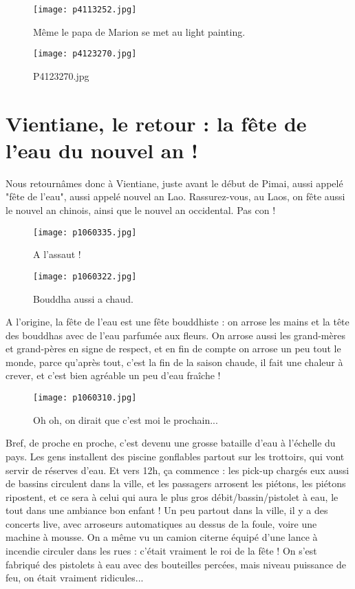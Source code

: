 \documentclass{book}
\begin{document}
\begin{figure}[h]
\centering
\texttt{[image: p4113252.jpg]}
\caption*{Même le papa de Marion se met au light painting.}
\end{figure}


\begin{figure}[h]
\centering
\texttt{[image: p4123270.jpg]}
\caption*{P4123270.jpg}
\end{figure}






\chapter{Vientiane, le retour : la fête de l'eau du nouvel an !}
Nous retournâmes donc à Vientiane, juste avant le début de Pimai, aussi appelé "fête de l'eau", aussi appelé nouvel an Lao. Rassurez-vous, au Laos, on fête aussi le nouvel an chinois, ainsi que le nouvel an occidental. Pas con !


\begin{figure}[h]
\centering
\texttt{[image: p1060335.jpg]}
\caption*{A l'assaut !}
\end{figure}




\begin{figure}[h]
\centering
\texttt{[image: p1060322.jpg]}
\caption*{Bouddha aussi a chaud.}
\end{figure}

A l'origine, la fête de l'eau est une fête bouddhiste : on arrose les mains et la tête des bouddhas avec de l'eau parfumée aux fleurs. On arrose aussi les grand-mères et grand-pères en signe de respect, et en fin de compte on arrose un peu tout le monde, parce qu'après tout, c'est la fin de la saison chaude, il fait une chaleur à crever, et c'est bien agréable un peu d'eau fraîche !


\begin{figure}[h]
\centering
\texttt{[image: p1060310.jpg]}
\caption*{Oh oh, on dirait que c'est moi le prochain...}
\end{figure}

Bref, de proche en proche, c'est devenu une grosse bataille d'eau à l'échelle du pays. Les gens installent des piscine gonflables partout sur les trottoirs, qui vont servir de réserves d'eau. Et vers 12h, ça commence : les pick-up chargés eux aussi de bassins circulent dans la ville, et les passagers arrosent les piétons, les piétons ripostent, et ce sera à celui qui aura le plus gros débit/bassin/pistolet à eau, le tout dans une ambiance bon enfant ! Un peu partout dans la ville, il y a des concerts live, avec arroseurs automatiques au dessus de la foule, voire une machine à mousse. On a même vu un camion citerne équipé d'une lance à incendie circuler dans les rues : c'était vraiment le roi de la fête ! On s'est fabriqué des pistolets à eau avec des bouteilles percées, mais niveau puissance de feu, on était vraiment ridicules...
\end{document}
